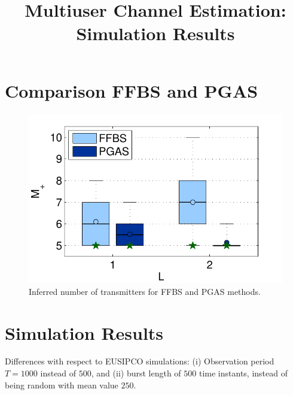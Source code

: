 \documentclass[a4paper,11pt]{article}
\title{\Huge{\textcolor{ColorTitulo}{\textbf{Multiuser Channel Estimation:\\Simulation Results}} \\}}
\author{}
\date{}
\begin{document}
% 
\maketitle %
% 
% 
% 
% 




% 

\section{Comparison FFBS and PGAS}

\begin{figure}[H]
\centering
\includegraphics[width=.3\textwidth]{ffbs_pgas/ffbs_pgas.pdf}
\caption{Inferred number of transmitters for FFBS and PGAS methods.}\label{fig:ffbs_pgas}
\end{figure}

\section{Simulation Results}

Differences with respect to EUSIPCO simulations: (i) Observation period $T=1000$ instead of $500$, and (ii) burst length of $500$ time instants, instead of being random with mean value $250$.
\end{document}
